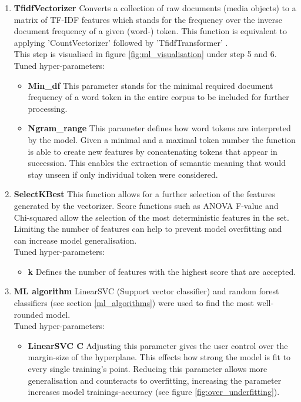 \begin{enumerate}
    \item \textbf{TfidfVectorizer} Converts a collection of raw documents (media objects) to a matrix of TF-IDF features which stands for the frequency over the inverse document frequency of a given (word-) token. This function is equivalent to applying 'CountVectorizer' followed by 'TfidfTransformer' \parencite{Scikit-learn2018}.\\
    This step is visualised in figure \ref{fig:ml_visualisation} under step 5 and 6.\\
    Tuned hyper-parameters:
    \begin{itemize}[label={}]
        \item \textbf{Min\_df} This parameter stands for the minimal required document frequency of a word token in the entire corpus to be included for further processing.
        \item \textbf{Ngram\_range} This parameter defines how word tokens are interpreted by the model. Given a minimal and a maximal token number the function is able to create new features by concatenating tokens that appear in succession. This enables the extraction of semantic meaning that would stay unseen if only individual token were considered.
    \end{itemize}
    
    \item \textbf{SelectKBest} This function allows for a further selection of the features generated by the vectorizer. Score functions such as ANOVA F-value and Chi-squared allow the selection of the most deterministic features in the set. Limiting the number of features can help to prevent model overfitting and can increase model generalisation.\\
    Tuned hyper-parameters:
    \begin{itemize}[label={}]
        \item \textbf{k} Defines the number of features with the highest score that are accepted.
    \end{itemize}
    
    \item \textbf{ML algorithm} LinearSVC (Support vector classifier) and random forest classifiers (see section \ref{ml_algorithms}) were used to find the most well-rounded model.\\
    Tuned hyper-parameters:
    \begin{itemize}[label={}]
        \item \textbf{LinearSVC C} Adjusting this parameter gives the user control over the margin-size of the hyperplane. This effects how strong the model is fit to every single training's point. Reducing this parameter allows more generalisation and counteracts to overfitting, increasing the parameter increases model trainings-accuracy (see figure \ref{fig:over_underfitting}).
        

\end{itemize}
\end{enumerate}
